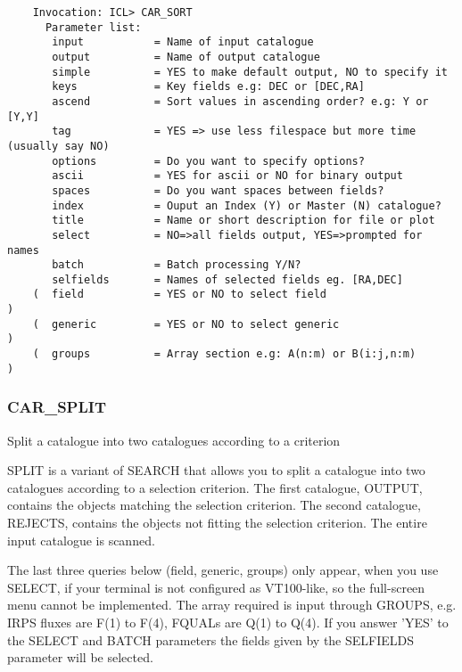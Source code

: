 \begin{verbatim}
    Invocation: ICL> CAR_SORT
      Parameter list:
       input           = Name of input catalogue
       output          = Name of output catalogue
       simple          = YES to make default output, NO to specify it
       keys            = Key fields e.g: DEC or [DEC,RA]
       ascend          = Sort values in ascending order? e.g: Y or [Y,Y]
       tag             = YES => use less filespace but more time (usually say NO)
       options         = Do you want to specify options?
       ascii           = YES for ascii or NO for binary output
       spaces          = Do you want spaces between fields?
       index           = Ouput an Index (Y) or Master (N) catalogue?
       title           = Name or short description for file or plot
       select          = NO=>all fields output, YES=>prompted for names
       batch           = Batch processing Y/N?
       selfields       = Names of selected fields eg. [RA,DEC]
    (  field           = YES or NO to select field                               )
    (  generic         = YES or NO to select generic                             )
    (  groups          = Array section e.g: A(n:m) or B(i:j,n:m)                 )
\end{verbatim}
 
\subsubsection{CAR\_SPLIT}

Split a catalogue into two catalogues according to a criterion

SPLIT is a variant of SEARCH that allows you to split a catalogue into 
two catalogues according to a selection criterion.  
The first catalogue, OUTPUT, contains the objects matching the selection 
criterion.  
The second catalogue, REJECTS, contains the objects not fitting the selection 
criterion.  
The entire input catalogue is scanned.

The last three queries below (field, generic, groups) only appear, when you use
SELECT, if your terminal is not configured as VT100-like, so the full-screen 
menu cannot be implemented.
The array required is input through GROUPS, e.g. IRPS fluxes are F(1) to 
F(4), FQUALs are Q(1) to Q(4).
If you answer 'YES' to the SELECT and BATCH parameters the fields given by the
SELFIELDS parameter will be selected.

